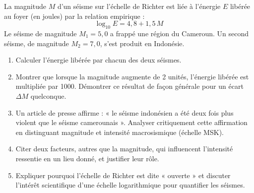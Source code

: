 \documentclass[11pt]{article}
\begin{document}
\begin{exercice}
La magnitude $M$ d'un séisme sur l'échelle de Richter est liée à l'énergie $E$ libérée au foyer (en joules) par la relation empirique :
\[ \log_{10} E = 4{,}8 + 1{,}5\,M \]
Le séisme de magnitude $M_1 = 5{,}0$ a frappé une région du Cameroun. Un second séisme, de magnitude $M_2 = 7{,}0$, s'est produit en Indonésie.

\begin{enumerate}
\item Calculer l'énergie libérée par chacun des deux séismes.
\item Montrer que lorsque la magnitude augmente de 2 unités, l'énergie libérée est multipliée par 1000. Démontrer ce résultat de façon générale pour un écart $\Delta M$ quelconque.
\item Un article de presse affirme : « le séisme indonésien a été deux fois plus violent que le séisme camerounais ». Analyser critiquement cette affirmation en distinguant magnitude et intensité macrosismique (échelle MSK).
\item Citer deux facteurs, autres que la magnitude, qui influencent l'intensité ressentie en un lieu donné, et justifier leur rôle.
\item Expliquer pourquoi l'échelle de Richter est dite « ouverte » et discuter l'intérêt scientifique d'une échelle logarithmique pour quantifier les séismes.
\end{enumerate}
\end{exercice}
\end{document}
